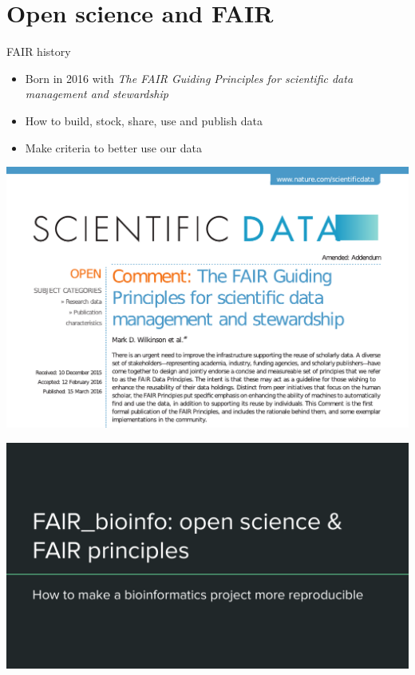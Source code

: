 \section{Open science and FAIR}
\begin{frame}
\begin{block}{FAIR history}
\begin{itemize}
\item Born in 2016 with \textit{The FAIR Guiding Principles for scientific data management and stewardship}
\item How to build, stock, share, use and publish data
\item Make criteria to better use our data
\end{itemize}
\end{block}
\end{frame}

\begin{frame}
\centering\includegraphics[scale=0.6]{images/fair_paper_2016_crop.pdf}
\end{frame}

\begin{frame}
\includegraphics[page=8,scale=0.55]{01_OS_and_FAIR_intro.pdf}
\end{frame}

